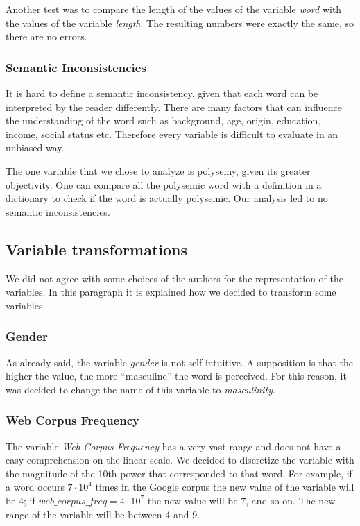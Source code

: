 \documentclass[a4paper,11pt,dvipsnames]{article}
\begin{document}
Another test was to compare the length of the values of the variable \textit{word} with the values of the variable \textit{length}. The resulting numbers were exactly the same, so there are no errors.


\subsubsection{Semantic Inconsistencies}

It is hard to define a semantic inconsistency, given that each word can be interpreted by the reader differently. There are many factors that can influence the understanding of the word such as  background, age, origin, education, income, social status etc. Therefore every variable is difficult to evaluate in an unbiased way. 

The one variable that we chose to analyze is polysemy, given its greater objectivity. One can compare all the polysemic word with a definition in a dictionary to check if the word is actually polysemic. Our analysis led to no semantic inconsistencies.

\subsection{Variable transformations}

We did not agree with some choices of the authors for the representation of the variables. In this paragraph it is explained how we decided to transform some variables.

\subsubsection{Gender}

As already said, the variable \textit{gender} is not self intuitive.  A  supposition  is  that  the  higher  the  value,  the  more ``masculine'' the word is perceived. For this reason, it was decided to change the name of this variable to \textit{masculinity}.

\subsubsection{Web Corpus Frequency}\label{discretize}

The variable\textit{ Web Corpus Frequency} has a very vast range and does not have a easy comprehension on the linear scale. We decided to discretize the variable with the magnitude of the 10th power that corresponded to that word. For example, if a word occurs $7\cdot10^4$ times in the Google corpus the new value of the variable will be 4; if $web\_corpus\_freq=4\cdot 10^7$ the new value will be 7, and so on. The new range of the variable will be between 4 and 9. 
\end{document}
